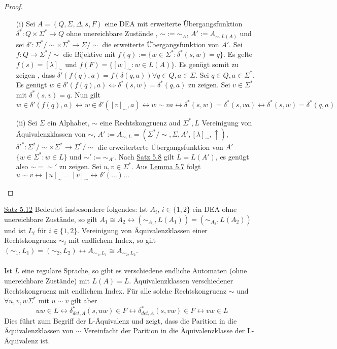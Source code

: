 \begin{proof}
  \begin{itemize}
    \item [(i)] Sei $A = (Q, \Sigma, \Delta, s, F)$ eine DEA mit erweiterte Übergangsfunktion $\delta^* : Q \times \Sigma^* \to Q$ ohne unereichbare Zustände , $\sim := \sim_A$, $A' := A_{\sim, L(A)}$ und sei $\delta' : \Sigma^* / \sim \times \Sigma^* \to \Sigma/\sim$ die erweiterte Übergangsfunktion von $A'$. Sei $f : Q \to \Sigma^* / \sim$ die Bijektive mit $f(q) := \{ w \in \Sigma^* : \delta^*(s,w) = q\}$. Es gelte $f(s) = [\lambda]_{\sim}$ und $f(F) = \{[w]_{\sim} : w \in L(A)\}$. Es genügt somit zu zeigen , dass $\delta'(f(q), a) = f(\delta(q,a)) \forall q \in Q, a \in \Sigma$. Sei $q \in Q, a \in \Sigma^*$. Es genügt $w \in \delta' (f(q), a) \Leftrightarrow \delta^*(s,w) = \delta^*(q, a)$ zu zeigen. Sei $v \in \Sigma^*$ mit $\delta^*(s,v) = q$. Nun gilt $w \in \delta'(f(q), a) \leftrightarrow w \in \delta'([v]_{\sim}, a) \leftrightarrow w \sim va \leftrightarrow \delta^*(s,w) = \delta^*(s, va) \leftrightarrow \delta^*(s,w) = \delta^*(q,a)$  %
    \item [(ii)] Sei $\Sigma$ ein Alphabet, $\sim$ eine Rechtskongruenz aud $\Sigma^*, L$ Vereinigung von Äquivalenzklassen von $\sim$, $A' := A_{\sim, L} = (\Sigma^*/\sim, \Sigma, A', [\lambda]_{\sim}, \uparrow)$, $\delta'^* : \Sigma^*/\sim \times \Sigma^* \to \Sigma^*/\sim$ die erweiterterte Übergangsfunktion von $A'$ $\{w \in \Sigma^* : w \in L \}$ und $\sim' := \sim_{A'}$. Nach \hyperref[subsec:5.8]{Satz 5.8} gilt $L = L(A')$, es genügt also $\sim = \sim'$ zu zeigen. Sei $u, v \in \Sigma^*$. Aus \hyperref[subsec:5.7]{Lemma 5.7}  folgt $u \sim v \leftrightarrow 
    [u]_{\sim} = [v]_{\sim} \leftrightarrow \delta'(...)$$\dots$
  \end{itemize}
\end{proof}
\hyperref[subsec:5.12]{Satz 5.12} Bedeutet insbesondere folgendes: Ist $A_i$, $i \in \{1, 2\}$ ein DEA ohne unereichbare Zustände, so gilt $A_1 \cong  A_2 \leftrightarrow (\sim_{A_1}, L(A_1)) = (\sim_{A_2}, L(A_2))$ und ist $L_i$ für $i \in \{1, 2\}$. Vereinigung von Äquivalenzklassen einer Rechtskongruenz $\sim_i$ mit endlichem Index, so gilt $(\sim_1, L_1) = (\sim_2, L_2) \leftrightarrow A_{\sim_1,L_1} \cong A_{\sim_2,L_2}$. \\\\ Ist $L$ eine reguläre Sprache, so gibt es verschiedene endliche Automaten (ohne unereichbare Zustände) mit $L(A) = L$. Äquivalenzklassen verschiedener Rechtskongruenz mit endlichem Index. Für alle solche Rechtskongruenz $\sim$ und $\forall u, v, w \Sigma^*$ mit $u \sim v$ gilt aber \[uw \in L \leftrightarrow \delta^*_{det, A} (s, uw) \in F \leftrightarrow \delta^*_{det, A} (s, vw) \in F \leftrightarrow vw \in L\] Dies führt zum Begriff der L-Äquivalenz und zeigt, dass die Parition in die Äquivalenzklassen von $\sim$ Vereinfacht der Parition in die Äquivalenzklasse der L-Äquivalenz ist.

